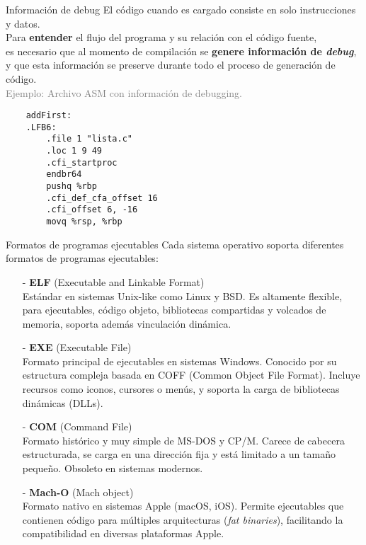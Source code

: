 \documentclass[aspectratio=169]{beamer}
\begin{document}
\begin{frame}[fragile,t]{Información de debug}
    El código cuando es cargado consiste en solo instrucciones y datos.\\
    \bigskip
    Para \textbf{entender} el flujo del programa y su relación con el código fuente,\\
    es necesario que al momento de compilación se \textbf{genere información de \emph{debug}},\\
    y que esta información se preserve durante todo el proceso de generación de código.\\
    \bigskip
    \pause
    \textcolor{gray}{Ejemplo: Archivo ASM con información de debugging.}
    { \small
    \begin{verbatim}
    addFirst:
    .LFB6:
        .file 1 "lista.c"
        .loc 1 9 49
        .cfi_startproc
        endbr64
        pushq %rbp
        .cfi_def_cfa_offset 16
        .cfi_offset 6, -16
        movq %rsp, %rbp
    \end{verbatim}
    }
\end{frame}

\begin{frame}[fragile,t]{Formatos de programas ejecutables}
    Cada sistema operativo soporta diferentes formatos de programas ejecutables:\\
    \vspace{0.2cm}
    \begin{itemize}
    \setlength\itemsep{0.3cm}
    \item[-] \small \textcolor{naranjauca}{\textbf{ELF} (Executable and Linkable Format)}\\
    Estándar en sistemas Unix-like como Linux y BSD. Es altamente flexible, para ejecutables, código objeto, bibliotecas compartidas y volcados de memoria, soporta además vinculación dinámica.
    \item[-] \small \textcolor{naranjauca}{\textbf{EXE} (Executable File)}\\
    Formato principal de ejecutables en sistemas Windows. Conocido por su estructura compleja basada en COFF (Common Object File Format). Incluye recursos como iconos, cursores o menús, y soporta la carga de bibliotecas dinámicas (DLLs).
    \item[-] \small \textcolor{naranjauca}{\textbf{COM} (Command File)}\\
    Formato histórico y muy simple de MS-DOS y CP/M. Carece de cabecera estructurada, se carga en una dirección fija y está limitado a un tamaño pequeño. Obsoleto en sistemas modernos.
    \item[-] \small \textcolor{naranjauca}{\textbf{Mach-O} (Mach object)}\\
    Formato nativo en sistemas Apple (macOS, iOS). Permite ejecutables que contienen código para múltiples arquitecturas (\textit{fat binaries}), facilitando la compatibilidad en diversas plataformas Apple.
    \end{itemize}
\end{frame}
\end{document}

